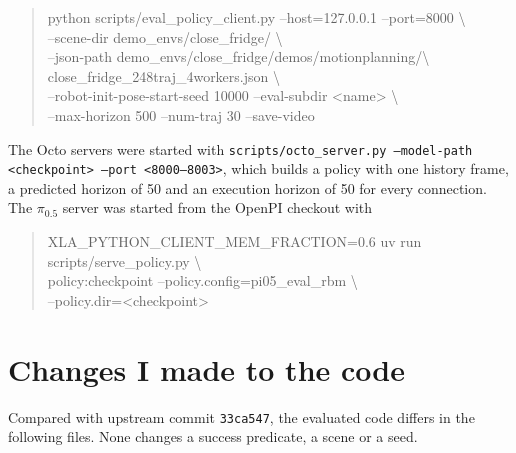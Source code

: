 \begin{quote}\small\ttfamily\raggedright
python scripts/eval\_policy\_client.py --host=127.0.0.1 --port=8000 \textbackslash\\
\hspace*{2em}--scene-dir demo\_envs/close\_fridge/ \textbackslash\\
\hspace*{2em}--json-path demo\_envs/close\_fridge/demos/motionplanning/\textbackslash\\
\hspace*{4em}close\_fridge\_248traj\_4workers.json \textbackslash\\
\hspace*{2em}--robot-init-pose-start-seed 10000 --eval-subdir <name> \textbackslash\\
\hspace*{2em}--max-horizon 500 --num-traj 30 --save-video
\end{quote}

The Octo servers were started with \texttt{scripts/octo\_server.py --model-path <checkpoint> --port <8000--8003>}, which builds a policy with one history frame, a predicted horizon of 50 and an execution horizon of 50 for every connection. The $\pi_{0.5}$ server was started from the OpenPI checkout with

\begin{quote}\small\ttfamily\raggedright
XLA\_PYTHON\_CLIENT\_MEM\_FRACTION=0.6 uv run scripts/serve\_policy.py \textbackslash\\
\hspace*{2em}policy:checkpoint --policy.config=pi05\_eval\_rbm \textbackslash\\
\hspace*{2em}--policy.dir=<checkpoint>
\end{quote}

\section{Changes I made to the code}
\label{sec:my-changes}

Compared with upstream commit \texttt{33ca547}, the evaluated code differs in the following files. None changes a success predicate, a scene or a seed.

